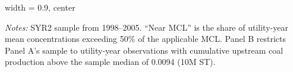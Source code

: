 \begin{table}[htbp]
\begin{adjustbox}{width = 0.9\textwidth, center}
\begin{tabular}
         \bottomrule
      \end{tabular}
   \end{adjustbox}
   \begin{minipage}{\linewidth}
   \vspace{4pt}
   {\tiny\linespread{1}\selectfont\raggedright \textit{Notes:} SYR2 sample from 1998--2005. ``Near MCL'' is the share of utility-year mean concentrations exceeding 50\% of the applicable MCL. Panel B restricts Panel A's sample to utility-year observations with cumulative upstream coal production above the sample median of 0.0094 (10M ST).}
   \end{minipage}
\end{table}

